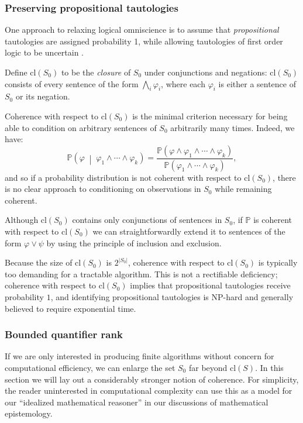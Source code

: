 \documentclass[12pt]{article}
\theoremstyle{definition}
\newcommand{\of}[1]{\left(#1\right)}
\newcommand{\ofc}[2]{\left(#1\;\middle\vert\;#2\right)}
\newcommand{\PP}{\mathbb{P}}
\newcommand{\Pc}[2]{\PP\ofc{#1}{#2}}
\renewcommand{\P}[1]{\mathbb{P}\of{#1}}
\newcommand{\vp}{\varphi}
\begin{document}
\subsubsection{Preserving propositional tautologies}\label{closedcoherence}

One approach to relaxing logical omniscience is to
assume that \emph{propositional} tautologies are assigned probability 1,
while allowing tautologies of first order logic to be uncertain \cite{gaifman04}.

\newcommand{\cl}[1]{\text{cl}\of{#1}}
\newcommand{\clS}{\cl{S_0}}
Define $\clS$ to be the \emph{closure} of $S_0$
under conjunctions and negations:
$\clS$ consists of every sentence of the form
$ \bigwedge \limits_i \vp_i $,
where each $\vp_i$ is either a sentence of $S_0$ or its negation.

Coherence with respect to $\clS$ is the minimal criterion
necessary for being able to condition on arbitrary
sentences of $S_0$ arbitrarily many times.
Indeed, we have:
\[ \Pc{\vp}{\vp_1 \wedge \cdots \wedge \vp_k} = \frac {\P{\vp \wedge \vp_1 \wedge \cdots \wedge \vp_k}}{\P{\vp_1 \wedge \cdots \wedge \vp_k}}, \]
and so if a probability distribution is not coherent with respect to $\clS$,
there is no clear approach to conditioning on observations in $S_0$
while remaining coherent.

Although $\clS$ contains only conjunctions of sentences in $S_0$,
if $\PP$ is coherent with respect to $\clS$
we can straightforwardly extend it to sentences of the form $\vp \vee \psi$
by using the principle of inclusion and exclusion.

Because the size of $\clS$ is $2^{|S_0|}$, coherence with respect to $\clS$
is typically too demanding for a tractable algorithm. 
This is not a rectifiable deficiency;
coherence with respect to $\clS$
implies that propositional tautologies receive probability $1$,
and identifying propositional tautologies
is NP-hard and generally believed to require exponential time.

\subsubsection{Bounded quantifier rank}\label{bounded-qr}

If we are only interested in producing finite algorithms
without concern for computational efficiency,
we can enlarge the set $S_0$ far beyond $\cl{S}$.
In this section we will lay out a considerably stronger notion of coherence.
For simplicity, the reader uninterested in computational complexity can use this as a model
for our ``idealized mathematical reasoner'' in our discussions of mathematical epistemology.
\end{document}
